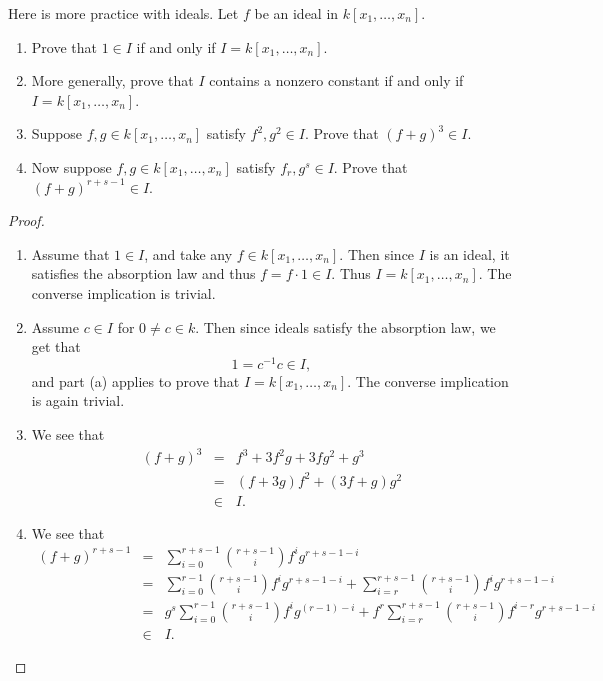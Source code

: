 \begin{exercise}{16}
Here is more practice with ideals. Let $f$ be an ideal in $k[x_1,\dots,x_n]$.
\begin{enumerate}
    \item Prove that $1\in I$ if and only if $I = k[x_1,\dots,x_n]$.
    \item More generally, prove that $I$ contains a nonzero constant if and only if $I = k[x_1,\dots,x_n]$.
    \item Suppose $f,g\in k[x_1,\dots,x_n]$ satisfy $f^2,g^2\in I$. Prove that $(f+g)^3\in I$.
    \item Now suppose $f,g\in k[x_1,\dots,x_n]$ satisfy $f_r, g^s\in I$. Prove that $(f+g)^{r+s-1}\in I$.
\end{enumerate}
\end{exercise}
\begin{proof}
    \begin{enumerate}
        \item Assume that $1\in I$, and take any $f\in k[x_1,\dots,x_n]$. Then since $I$ is an ideal, it satisfies the absorption law and thus $f = f\cdot 1\in I$. Thus $I = k[x_1,\dots,x_n]$. The converse implication is trivial.
        \item Assume $c\in I$ for $0\neq c\in k$. Then since ideals satisfy the absorption law, we get that
        $$1 = c^{-1}c \in I,$$
        and part (a) applies to prove that $I = k[x_1,\dots,x_n]$. The converse implication is again trivial.
        \item We see that
        \begin{eqnarray*}
            (f+g)^3
            & = & f^3 + 3f^2 g + 3fg^2 + g^3\\
            & = & (f + 3g)f^2 + (3f + g)g^2\\
            & \in & I.
        \end{eqnarray*}
        \item We see that
        \begin{eqnarray*}
            (f+g)^{r+s-1}
            & = & \sum_{i=0}^{r+s-1} \binom{r+s-1}{i} f^i g^{r+s-1-i}\\
            & = & \sum_{i=0}^{r-1}  \binom{r+s-1}{i} f^i g^{r+s-1-i} + \sum_{i=r}^{r+s-1}  \binom{r+s-1}{i} f^i g^{r+s-1-i}\\
            & = & g^s\sum_{i=0}^{r-1}  \binom{r+s-1}{i} f^i g^{(r-1)-i} + f^r\sum_{i=r}^{r+s-1}  \binom{r+s-1}{i} f^{i-r} g^{r+s-1-i}\\
            & \in & I.
        \end{eqnarray*}
    \end{enumerate}
\end{proof}

